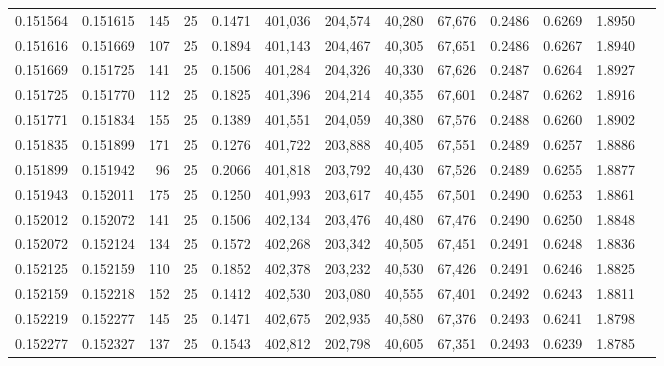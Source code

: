 \begin{tabular}{rrrrrrrrrrrrr}
0.151564 & 0.151615 &   145 &  25 &                                     0.1471 & 401,036 & 204,574 &  40,280 &  67,676 & 0.2486 & 0.6269 & 1.8950 \\
0.151616 & 0.151669 &   107 &  25 &                                     0.1894 & 401,143 & 204,467 &  40,305 &  67,651 & 0.2486 & 0.6267 & 1.8940 \\
0.151669 & 0.151725 &   141 &  25 &                                     0.1506 & 401,284 & 204,326 &  40,330 &  67,626 & 0.2487 & 0.6264 & 1.8927 \\
0.151725 & 0.151770 &   112 &  25 &                                     0.1825 & 401,396 & 204,214 &  40,355 &  67,601 & 0.2487 & 0.6262 & 1.8916 \\
0.151771 & 0.151834 &   155 &  25 &                                     0.1389 & 401,551 & 204,059 &  40,380 &  67,576 & 0.2488 & 0.6260 & 1.8902 \\
0.151835 & 0.151899 &   171 &  25 &                                     0.1276 & 401,722 & 203,888 &  40,405 &  67,551 & 0.2489 & 0.6257 & 1.8886 \\
0.151899 & 0.151942 &    96 &  25 &                                     0.2066 & 401,818 & 203,792 &  40,430 &  67,526 & 0.2489 & 0.6255 & 1.8877 \\
0.151943 & 0.152011 &   175 &  25 &                                     0.1250 & 401,993 & 203,617 &  40,455 &  67,501 & 0.2490 & 0.6253 & 1.8861 \\
0.152012 & 0.152072 &   141 &  25 &                                     0.1506 & 402,134 & 203,476 &  40,480 &  67,476 & 0.2490 & 0.6250 & 1.8848 \\
0.152072 & 0.152124 &   134 &  25 &                                     0.1572 & 402,268 & 203,342 &  40,505 &  67,451 & 0.2491 & 0.6248 & 1.8836 \\
0.152125 & 0.152159 &   110 &  25 &                                     0.1852 & 402,378 & 203,232 &  40,530 &  67,426 & 0.2491 & 0.6246 & 1.8825 \\
0.152159 & 0.152218 &   152 &  25 &                                     0.1412 & 402,530 & 203,080 &  40,555 &  67,401 & 0.2492 & 0.6243 & 1.8811 \\
0.152219 & 0.152277 &   145 &  25 &                                     0.1471 & 402,675 & 202,935 &  40,580 &  67,376 & 0.2493 & 0.6241 & 1.8798 \\
0.152277 & 0.152327 &   137 &  25 &                                     0.1543 & 402,812 & 202,798 &  40,605 &  67,351 & 0.2493 & 0.6239 & 1.8785 \\

\end{tabular}
